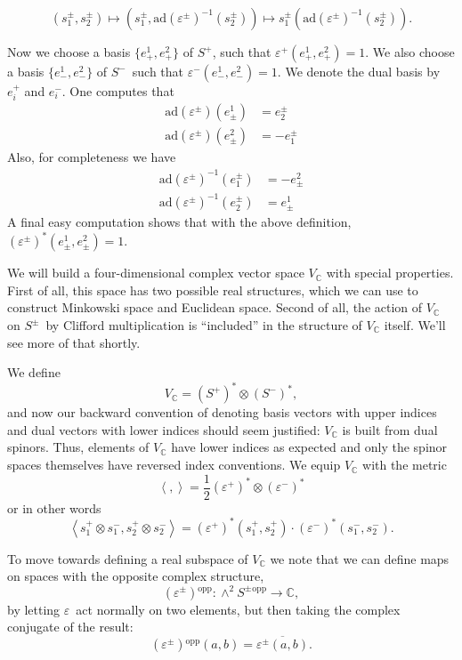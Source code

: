\documentclass[twoside]{amsart}
\newcommand{\CC}{\ensuremath{\mathbb{C}}}
\renewcommand{\epsilon}{\varepsilon}
\newcommand{\enm}[1]{\ensuremath{#1}}
\newcommand{\ip}[2]{\enm{\left<#1,#2\right>}}
\newcommand{\ad}{\enm{\mathrm{ad}}}
\newcommand{\spl}{\enm{S^{+}}}
\newcommand{\sm}{\enm{S^{-}}}
\newcommand{\spm}{\enm{S^{\pm}}}
\newcommand{\spd}{\enm{(\spl)^{*}}}
\newcommand{\smd}{\enm{(\sm)^{*}}}
\newcommand{\eps}{\enm{\epsilon}}
\newcommand{\eij}[2]{\enm{e^{#1}_{#2}}}
\newcommand{\ei}[1]{\enm{e^{#1}_{+}}}
\newcommand{\eib}[1]{\enm{e^{#1}_{-}}}
\newcommand{\eil}[1]{\enm{e_{#1}^{+}}}
\newcommand{\eilb}[1]{\enm{e_{#1}^{-}}}
\newcommand{\eipm}[1]{\eij{#1}{\pm}}
\newcommand{\eilpm}[1]{\eij{\pm}{#1}}
\renewcommand{\epsilon}{\varepsilon}
\newcommand{\opp}[1]{\enm{{#1}{}^{\mathrm{opp}}}}
\begin{document}
\[ (s_{1}^{\pm}, s_{2}^{\pm})\mapsto
(s_{1}^{\pm}, \ad(\eps^{\pm})^{-1}(s_{2}^{\pm})) \mapsto
s_{1}^{\pm} (\ad(\epsilon^{\pm})^{-1}(s_{2}^{\pm})).
\]

Now we choose a basis \( \{\ei{1}, \ei{2}\} \) of \spl, such that \(
\eps^{+}(\ei{1}, \ei{2}) = 1.  \) We also choose a basis
\( \{\eib{1}, \eib{2}\} \) of \sm\ such that \( \eps^{-}(\eib{1},
\eib{2}) = 1.  \) We denote the dual basis by \( \eil{i} \) and \(
\eilb{i} \). One computes that
\begin{align}
    \ad(\eps^{\pm})(\eipm{1}) &= \eilpm{2}\label{eq:epslower} \\
    \ad(\eps^{\pm})(\eipm{2}) &= -\eilpm{1}\label{eq:epslower2}
\end{align}
Also, for completeness we have
\begin{align}
    \ad(\eps^{\pm})^{-1}(\eilpm{1}) &= -\eipm{2}\label{eq:epsraise} \\
    \ad(\eps^{\pm})^{-1}(\eilpm{2}) &= \eipm{1}\label{eq:epsraise2}
\end{align}
A final easy computation shows that with the above definition,
\( (\eps^{\pm})^{*}(e^{1}_{\pm}, e^{2}_{\pm}) = 1. \)

We will build a four-dimensional complex vector space \( V_{\CC} \)
with special properties.  First of all, this space has two possible
real structures, which we can use to construct Minkowski space and
Euclidean space.  Second of all, the action of \( V_{\CC} \) on \spm\
by Clifford multiplication is ``included'' in the structure of \(
V_{\CC} \) itself.  We'll see more of that shortly.

We define
\[ V_{\CC} = \spd\otimes\smd, \]
and now our backward convention of denoting basis vectors with upper
indices and dual vectors with lower indices should seem justified: \(
V_{\CC} \) is built from dual spinors.  Thus, elements of \( V_{\CC}
\)
have lower indices as expected and only the spinor spaces themselves
have reversed index conventions.  We equip \( V_{\CC} \) with the
metric
\[ \ip{}{} = \frac{1}{2}(\eps^{+})^{*}\otimes(\eps^{-})^{*} \]
or in other words
\[ \ip{s_{1}^{+}\otimes s_{1}^{-}}{s_{2}^{+}\otimes s_{2}^{-}} =
(\eps^{+})^{*}(s_{1}^{+}, s_{2}^{+})\cdot
(\eps^{-})^{*}(s_{1}^{-}, s_{2}^{-}). \]

To move towards defining a real subspace of \( V_{\CC} \) we note
that
we can define maps on spaces with the opposite complex structure,
\[ \opp{(\eps^{\pm})}:\opp{\wedge^{2}\spm}\to \CC, \]
by letting \eps\ act normally on two elements, but then taking the
complex conjugate of the result:
\[ \opp{(\eps^{\pm})}(a, b) = \overline{\eps^{\pm}(a, b)}. \]
\end{document}
